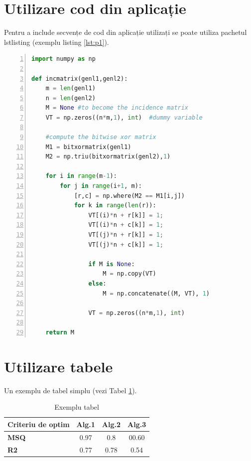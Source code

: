 \documentclass[12pt,a4paper]{report}
\theoremstyle{definition}
\theoremstyle{remark}
\begin{document}
\section{Utilizare cod din aplicație}
Pentru a include secvențe de cod din aplicație utilizați se poate utiliza pachetul lstlisting (exemplu listing \ref{lst:p1}).
\begin{lstlisting}[language=Python, numbers=left,
    stepnumber=1, caption=Un exemplu de cod python, label=lst:p1]
import numpy as np
    
def incmatrix(genl1,genl2):
    m = len(genl1)
    n = len(genl2)
    M = None #to become the incidence matrix
    VT = np.zeros((n*m,1), int)  #dummy variable
    
    #compute the bitwise xor matrix
    M1 = bitxormatrix(genl1)
    M2 = np.triu(bitxormatrix(genl2),1) 

    for i in range(m-1):
        for j in range(i+1, m):
            [r,c] = np.where(M2 == M1[i,j])
            for k in range(len(r)):
                VT[(i)*n + r[k]] = 1;
                VT[(i)*n + c[k]] = 1;
                VT[(j)*n + r[k]] = 1;
                VT[(j)*n + c[k]] = 1;
                
                if M is None:
                    M = np.copy(VT)
                else:
                    M = np.concatenate((M, VT), 1)
                
                VT = np.zeros((n*m,1), int)
    
    return M
\end{lstlisting}

\section{Utilizare tabele}

Un exemplu de tabel simplu (vezi Tabel \ref{tab:my_tabel}). 

\begin{table}[!ht]
    \centering
    \begin{tabular}{|l | c |  c | c |} 
 \hline
 Criteriu de optim & \textbf{Alg.1} & \textbf{Alg.2} & \textbf{Alg.3} \\  
 \hline\hline
\textbf{ MSQ} & 0.97 & 0.8 & 00.60 \\ 
 \hline
 \textbf{R2} & 0.77 & 0.78 & 0.54 \\
 \hline
 
 \hline
\end{tabular}
    \caption{Exemplu tabel}
    \label{tab:my_tabel}
\end{table}
\end{document}
